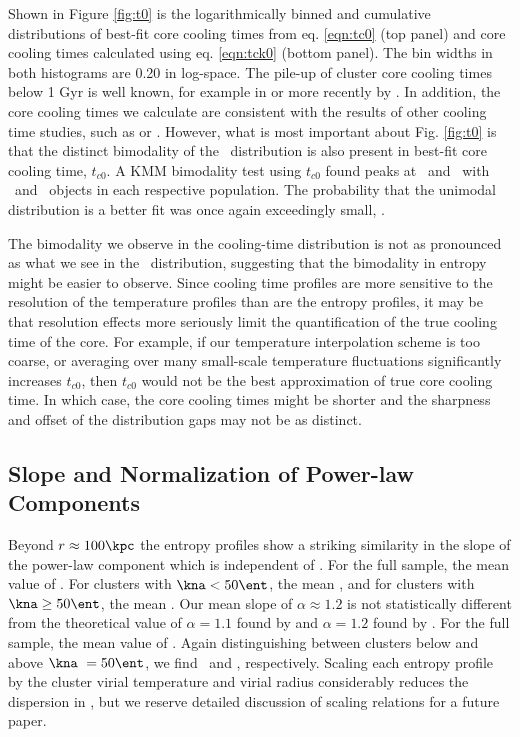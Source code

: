 \documentclass{emulateapj}
\begin{document}
Shown in Figure \ref{fig:t0} is the logarithmically binned and
cumulative distributions of best-fit core cooling times from
eq. \ref{eqn:tc0} (top panel) and core cooling times calculated using
eq. \ref{eqn:tck0} (bottom panel). The bin widths in both histograms
are 0.20 in log-space. The pile-up of cluster core cooling times below
1 Gyr is well known, for example in \citet{hu85} or more recently by
\citet{dunn08}. In addition, the core cooling times we calculate are
consistent with the results of other cooling time studies, such as
\citet{1998MNRAS.298..416P} or \citet{2008arXiv0802.1864R}. However,
what is most important about Fig. \ref{fig:t0} is that the distinct
bimodality of the \kna\ distribution is also present in best-fit core
cooling time, $t_{c0}$. A KMM bimodality test using $t_{c0}$ found
peaks at \tckmma\ and \tckmmb\ with \tckmmc\ and \tckmmd\ objects in
each respective population. The probability that the unimodal
distribution is a better fit was once again exceedingly small,
\tckmme.

The bimodality we observe in the cooling-time distribution is not as
pronounced as what we see in the \kna\ distribution, suggesting that
the bimodality in entropy might be easier to observe. Since cooling
time profiles are more sensitive to the resolution of the temperature
profiles than are the entropy profiles, it may be that resolution
effects more seriously limit the quantification of the true cooling
time of the core. For example, if our temperature interpolation scheme
is too coarse, or averaging over many small-scale temperature
fluctuations significantly increases $t_{c0}$, then $t_{c0}$ would not
be the best approximation of true core cooling time. In which case,
the core cooling times might be shorter and the sharpness and offset
of the distribution gaps may not be as distinct.

\subsection{Slope and Normalization of Power-law Components}
\label{sec:slopes}

Beyond $r \approx 100 \kpc$ the entropy profiles show a striking
similarity in the slope of the power-law component which is
independent of \kna. For the full sample, the mean value of
\alphafs. For clusters with $\kna < 50 \ent$, the mean
\alphaga, and for clusters with $\kna \geq 50 \ent$, the mean
\alphagb. Our mean slope of $\alpha \approx 1.2$ is not statistically
different from the theoretical value of $\alpha = 1.1$ found by
\citet{tozzi01} and $\alpha = 1.2$ found by \citet{vkb05}. For the
full sample, the mean value of \khunfs. Again distinguishing between
clusters below and above $\kna\ = 50 \ent$, we find \khunga\ and
\khungb, respectively. Scaling each entropy profile by the cluster
virial temperature and virial radius considerably reduces the
dispersion in \khun, but we reserve detailed discussion of scaling
relations for a future paper.
\end{document}
